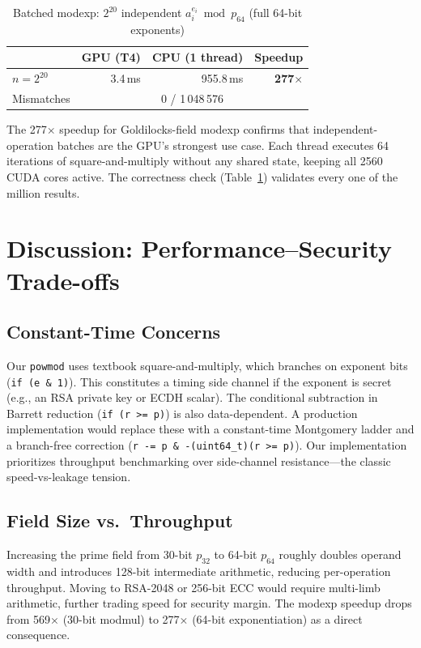 \documentclass[conference]{IEEEtran}
\begin{document}
\begin{table}[h]
\centering
\caption{Batched modexp: $2^{20}$ independent $a_i^{e_i} \bmod p_{64}$ (full 64-bit exponents)}
\label{tab:modexp}
\begin{tabular}{lrrr}
\toprule
 & GPU (T4) & CPU (1 thread) & Speedup \\
\midrule
$n = 2^{20}$ & 3.4\,ms & 955.8\,ms & \textbf{277$\times$} \\
Mismatches & \multicolumn{3}{c}{0 / 1\,048\,576} \\
\bottomrule
\end{tabular}
\end{table}

The 277$\times$ speedup for Goldilocks-field modexp confirms that independent-operation batches are
the GPU's strongest use case. Each thread executes 64 iterations of square-and-multiply without any
shared state, keeping all 2560 CUDA cores active. The correctness check (Table~\ref{tab:modexp})
validates every one of the million results.

\section{Discussion: Performance--Security Trade-offs}
\label{sec:discuss}

\subsection{Constant-Time Concerns}

Our \texttt{powmod} uses textbook square-and-multiply, which branches on exponent bits
(\texttt{if (e \& 1)}). This constitutes a timing side channel if the exponent is secret (e.g., an
RSA private key or ECDH scalar). The conditional subtraction in Barrett reduction (\texttt{if (r >=
p)}) is also data-dependent. A production implementation would replace these with a
constant-time Montgomery ladder and a branch-free correction
(\texttt{r -= p \& -(uint64\_t)(r >= p)}). Our implementation prioritizes throughput benchmarking
over side-channel resistance—the classic speed-vs-leakage tension.

\subsection{Field Size vs.\ Throughput}

Increasing the prime field from 30-bit $p_{32}$ to 64-bit $p_{64}$ roughly doubles operand width
and introduces 128-bit intermediate arithmetic, reducing per-operation throughput. Moving to
RSA-2048 or 256-bit ECC would require multi-limb arithmetic, further trading speed for security
margin. The modexp speedup drops from 569$\times$ (30-bit modmul) to 277$\times$ (64-bit
exponentiation) as a direct consequence.
\end{document}

